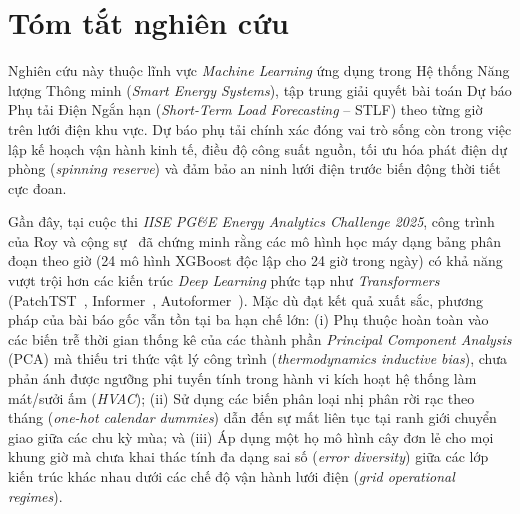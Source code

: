 \section{Tóm tắt nghiên cứu}

Nghiên cứu này thuộc lĩnh vực \textit{Machine Learning} ứng dụng trong Hệ thống Năng lượng Thông minh (\textit{Smart Energy Systems}), tập trung giải quyết bài toán Dự báo Phụ tải Điện Ngắn hạn (\textit{Short-Term Load Forecasting} -- STLF) theo từng giờ trên lưới điện khu vực. Dự báo phụ tải chính xác đóng vai trò sống còn trong việc lập kế hoạch vận hành kinh tế, điều độ công suất nguồn, tối ưu hóa phát điện dự phòng (\textit{spinning reserve}) và đảm bảo an ninh lưới điện trước biến động thời tiết cực đoan.

Gần đây, tại cuộc thi \textit{IISE PG\&E Energy Analytics Challenge 2025}, công trình của Roy và cộng sự~\cite{roy2025hourly} đã chứng minh rằng các mô hình học máy dạng bảng phân đoạn theo giờ (24 mô hình XGBoost độc lập cho 24 giờ trong ngày) có khả năng vượt trội hơn các kiến trúc \textit{Deep Learning} phức tạp như \textit{Transformers} (PatchTST~\cite{nie2023time}, Informer~\cite{zhou2021informer}, Autoformer~\cite{wu2021autoformer}). Mặc dù đạt kết quả xuất sắc, phương pháp của bài báo gốc vẫn tồn tại ba hạn chế lớn: (i) Phụ thuộc hoàn toàn vào các biến trễ thời gian thống kê của các thành phần \textit{Principal Component Analysis} (PCA) mà thiếu tri thức vật lý công trình (\textit{thermodynamics inductive bias}), chưa phản ánh được ngưỡng phi tuyến tính trong hành vi kích hoạt hệ thống làm mát/sưởi ấm (\textit{HVAC}); (ii) Sử dụng các biến phân loại nhị phân rời rạc theo tháng (\textit{one-hot calendar dummies}) dẫn đến sự mất liên tục tại ranh giới chuyển giao giữa các chu kỳ mùa; và (iii) Áp dụng một họ mô hình cây đơn lẻ cho mọi khung giờ mà chưa khai thác tính đa dạng sai số (\textit{error diversity}) giữa các lớp kiến trúc khác nhau dưới các chế độ vận hành lưới điện (\textit{grid operational regimes}).

